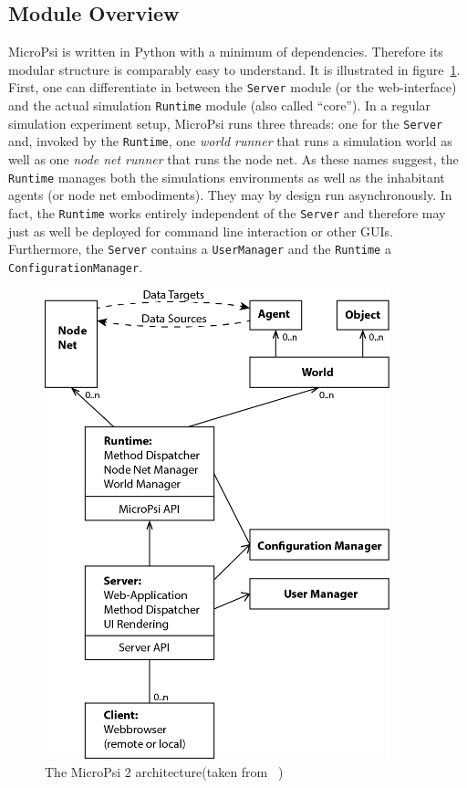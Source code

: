         \subsection{Module Overview}
MicroPsi is written in Python with a minimum of dependencies. Therefore its  modular structure is comparably easy to understand. It is illustrated in figure~\ref{micropsi2_modules}. First, one can differentiate in between the \texttt{Server} module (or the web-interface) and the actual simulation \texttt{Runtime} module (also called ``core''). In a regular simulation experiment setup, MicroPsi runs three threads: one for the \texttt{Server} and, invoked by the \texttt{Runtime}, one \emph{world runner} that runs a simulation world as well as one \emph{node net runner} that runs the node net. As these names suggest, the \texttt{Runtime} manages both the simulations environments as well as the inhabitant agents (or node net embodiments). They may by design run asynchronously. In fact, the \texttt{Runtime} works entirely independent of the \texttt{Server} and therefore may just as well be deployed for command line interaction or other GUIs. Furthermore, the \texttt{Server} contains a \texttt{UserManager} and the \texttt{Runtime} a \texttt{ConfigurationManager}.~\cite{conf/agi/Bach12}
\\          
          
\begin{figure}[h]
  \centering
    \includegraphics[width=10cm]{graphics/micropsi2_uml}
  \caption{The MicroPsi 2 architecture(taken from ~\cite{conf/agi/Bach12})}
  \label{micropsi2_modules}
\end{figure}

